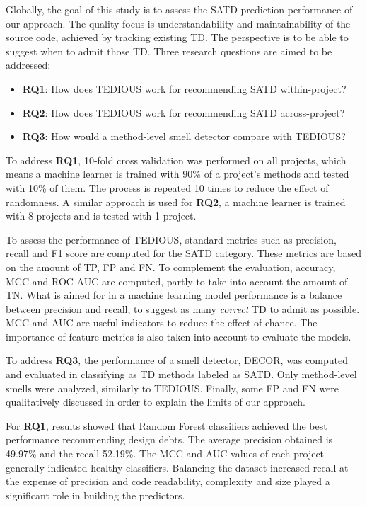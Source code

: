 Globally, the goal of this study is to assess the \ac{SATD} prediction performance of our approach. The quality focus is understandability and maintainability of the source code, achieved by tracking existing \ac{TD}. The perspective is to be able to suggest when to admit those \ac{TD}. Three research questions are aimed to be addressed: 

\begin{itemize}
	\item \textbf{RQ1}: How does \ac{TEDIOUS} work for recommending \ac{SATD} within-project?
	\item \textbf{RQ2}: How does \ac{TEDIOUS} work for recommending \ac{SATD} across-project?
	\item \textbf{RQ3}: How would a method-level smell detector compare with \ac{TEDIOUS}?
\end{itemize}

To address \textbf{RQ1}, 10-fold cross validation was performed on all projects, which means a machine learner is trained with 90\% of a project's methods and tested with 10\% of them. The process is repeated 10 times to reduce the effect of randomness. A similar approach is used for \textbf{RQ2}, a machine learner is trained with 8 projects and is tested with 1 project. \par

To assess the performance of \ac{TEDIOUS}, standard metrics such as precision, recall and F1 score are computed for the \ac{SATD} category. These metrics are based on the amount of \ac{TP}, \ac{FP} and \ac{FN}. To complement the evaluation, accuracy, \ac{MCC} and \ac{ROC} \ac{AUC} are computed, partly to take into account the amount of \ac{TN}. What is aimed for in a machine learning model performance is a balance between precision and recall, to suggest as many \emph{correct} \ac{TD} to admit as possible. \ac{MCC} and \ac{AUC} are useful indicators to reduce the effect of chance. The importance of feature metrics is also taken into account to evaluate the models. \par

To address \textbf{RQ3}, the performance of a smell detector, \ac{DECOR}, was computed and evaluated in classifying as \ac{TD} methods labeled as \ac{SATD}. Only method-level smells were analyzed, similarly to \ac{TEDIOUS}. Finally, some \ac{FP} and \ac{FN} were qualitatively discussed in order to explain the limits of our approach. \par

For \textbf{RQ1}, results showed that Random Forest classifiers achieved the best performance recommending design debts. The average precision obtained is 49.97\% and the recall 52.19\%. The MCC and AUC values of each project generally indicated healthy classifiers. Balancing the dataset increased recall at the expense of precision and code readability, complexity and size played a significant role in building the predictors. \par

